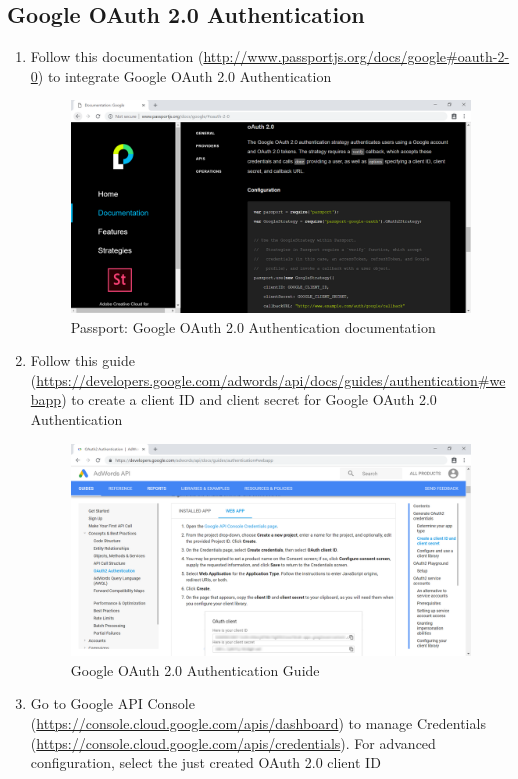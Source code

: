 \tocless\subsection{Google OAuth 2.0 Authentication}
\begin{enumerate}
	\item Follow this documentation (\href{http://www.passportjs.org/docs/google#oauth-2-0}{http://www.passportjs.org/docs/google\#oauth-2-0}) to integrate Google OAuth 2.0 Authentication
	      \begin{center}
	      	\begin{figure}[H]
	      		\centering
	      		\includegraphics[width=0.6\columnwidth]{images/appendixA/Google-OAuth-Passport.PNG}
	      		\caption{Passport: Google OAuth 2.0 Authentication documentation}
	      	\end{figure}
	      \end{center}
	\item Follow this guide (\href{https://developers.google.com/adwords/api/docs/guides/authentication#webapp}{https://developers.google.com/adwords/api/docs/guides/authentication\#webapp}) to create a client ID and client secret for Google OAuth 2.0 Authentication
	      \begin{center}
	      	\begin{figure}[H]
	      		\centering
	      		\includegraphics[width=0.6\columnwidth]{images/appendixA/Google-OAuth-Guide.PNG}
	      		\caption{Google OAuth 2.0 Authentication Guide}
	      	\end{figure}
	      \end{center}
	\item Go to Google API Console (\href{https://console.cloud.google.com/apis/dashboard}{https://console.cloud.google.com/apis/dashboard}) to manage Credentials (\href{https://console.cloud.google.com/apis/credentials}{https://console.cloud.google.com/apis/credentials}). For advanced configuration, select the just created OAuth 2.0 client ID

\end{enumerate}
